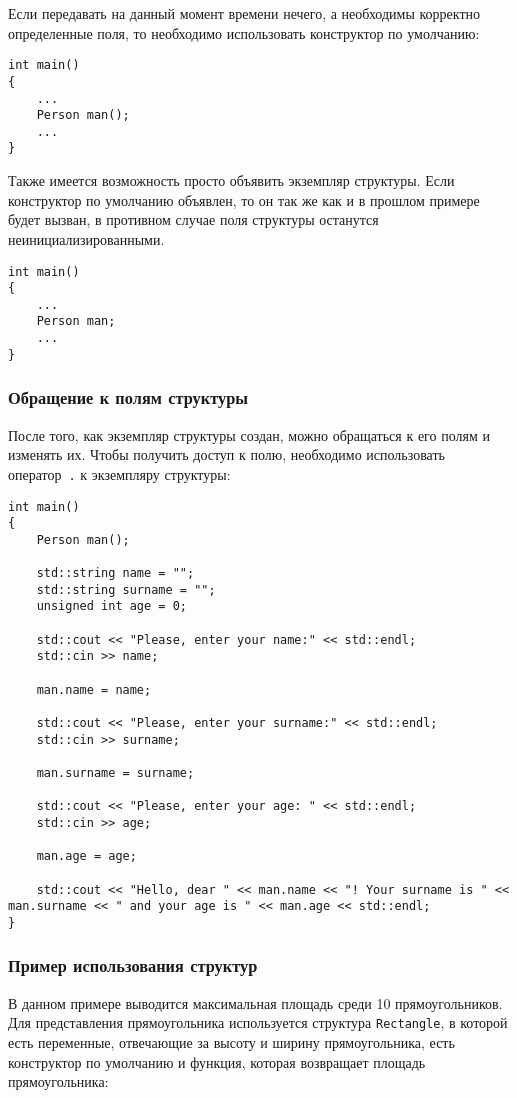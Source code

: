 Если передавать на данный момент времени нечего, а необходимы корректно определенные поля, то необходимо использовать конструктор по умолчанию:
\begin{lstlisting}
int main()
{
    ...
    Person man();
    ...
}
\end{lstlisting}

Также имеется возможность просто объявить экземпляр структуры.
Если конструктор по умолчанию объявлен, то он так же как и в прошлом примере будет вызван,
в противном случае поля структуры останутся неинициализированными.

\begin{lstlisting}
int main()
{
    ...
    Person man;
    ...
}
\end{lstlisting}

\subsubsection{Обращение к полям структуры}

После того, как экземпляр структуры создан, можно обращаться к его полям и изменять их. Чтобы получить доступ к полю, необходимо использовать оператор~\lstinline|.| к экземпляру структуры:

\begin{lstlisting}
int main()
{
    Person man();

    std::string name = "";
    std::string surname = "";
    unsigned int age = 0;

    std::cout << "Please, enter your name:" << std::endl;
    std::cin >> name;

    man.name = name;

    std::cout << "Please, enter your surname:" << std::endl;
    std::cin >> surname;

    man.surname = surname;

    std::cout << "Please, enter your age: " << std::endl;
    std::cin >> age;

    man.age = age;

    std::cout << "Hello, dear " << man.name << "! Your surname is " << man.surname << " and your age is " << man.age << std::endl;
}
\end{lstlisting}

\subsubsection{Пример использования структур}
В данном примере выводится максимальная площадь среди 10 прямоугольников. Для представления прямоугольника используется структура \lstinline|Rectangle|, в которой есть переменные, отвечающие за высоту и ширину прямоугольника, есть конструктор по умолчанию и функция, которая возвращает площадь прямоугольника:

